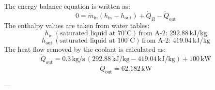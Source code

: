 The energy balance equation is written as:  
\[
0 = \dot{m}_{\text{in}} (h_{\text{in}} - h_{\text{out}}) + \dot{Q}_R - \dot{Q}_{\text{out}}
\]  
The enthalpy values are taken from water tables:  
\[
h_{\text{in}} \, (\text{saturated liquid at } 70^\circ\text{C}) \, \text{from A-2: } 292.88 \, \text{kJ/kg}
\]  
\[
h_{\text{out}} \, (\text{saturated liquid at } 100^\circ\text{C}) \, \text{from A-2: } 419.04 \, \text{kJ/kg}
\]  
The heat flow removed by the coolant is calculated as:  
\[
\dot{Q}_{\text{out}} = 0.3 \, \text{kg/s} \, (292.88 \, \text{kJ/kg} - 419.04 \, \text{kJ/kg}) + 100 \, \text{kW}
\]  
\[
\dot{Q}_{\text{out}} = 62.182 \, \text{kW}
\]  

---